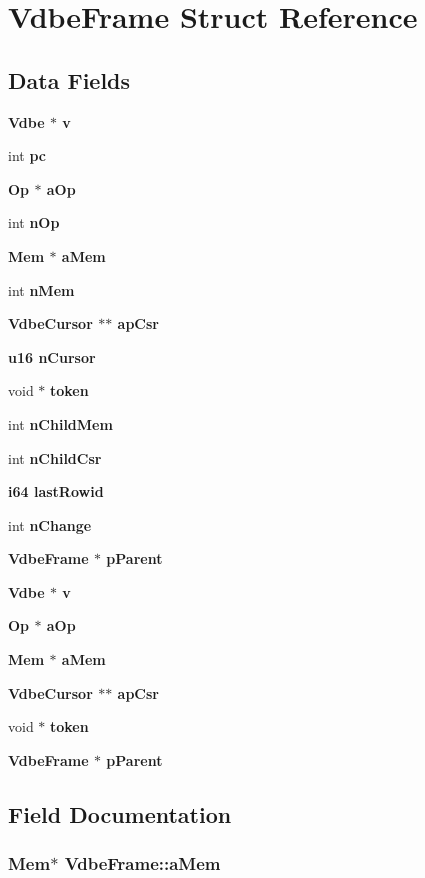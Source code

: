 \section{Vdbe\-Frame Struct Reference}
\label{structVdbeFrame}
\subsection*{Data Fields}
\begin{CompactItemize}
\item 
\bf{Vdbe} $\ast$ \bf{v}
\item 
int \bf{pc}
\item 
\bf{Op} $\ast$ \bf{a\-Op}
\item 
int \bf{n\-Op}
\item 
\bf{Mem} $\ast$ \bf{a\-Mem}
\item 
int \bf{n\-Mem}
\item 
\bf{Vdbe\-Cursor} $\ast$$\ast$ \bf{ap\-Csr}
\item 
\bf{u16} \bf{n\-Cursor}
\item 
void $\ast$ \bf{token}
\item 
int \bf{n\-Child\-Mem}
\item 
int \bf{n\-Child\-Csr}
\item 
\bf{i64} \bf{last\-Rowid}
\item 
int \bf{n\-Change}
\item 
\bf{Vdbe\-Frame} $\ast$ \bf{p\-Parent}
\item 
\bf{Vdbe} $\ast$ \bf{v}
\item 
\bf{Op} $\ast$ \bf{a\-Op}
\item 
\bf{Mem} $\ast$ \bf{a\-Mem}
\item 
\bf{Vdbe\-Cursor} $\ast$$\ast$ \bf{ap\-Csr}
\item 
void $\ast$ \bf{token}
\item 
\bf{Vdbe\-Frame} $\ast$ \bf{p\-Parent}
\end{CompactItemize}


\subsection{Field Documentation}
\subsubsection{\setlength{\rightskip}{0pt plus 5cm}\bf{Mem}$\ast$ \bf{Vdbe\-Frame::a\-Mem}}\label{structVdbeFrame_16b403dc3411af4b8296bcfc10bd8682}


